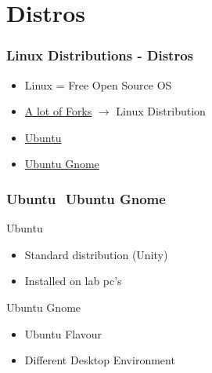 \begin{frame}
	
\end{frame}

\section{Distros}
\begin{frame}
	\frametitle{Linux Distributions - Distros}

	\begin{itemize}
		\item Linux = Free Open Source OS
        \item \href{https://upload.wikimedia.org/wikipedia/commons/1/1b/Linux_Distribution_Timeline.svg}{A lot of Forks} $\rightarrow$ Linux Distribution
	\end{itemize}
    \begin{itemize}
        \item \hyperlink{ubuntu}{Ubuntu}
        \item \hyperlink{ubuntu_gnome}{Ubuntu Gnome}
	\end{itemize}
\end{frame}

\begin{frame}[label=ubuntu]
	\frametitle{Ubuntu $ $ Ubuntu Gnome}
    Ubuntu
	\begin{itemize}
		\item Standard distribution (Unity)
		\item Installed on lab pc's
	\end{itemize}
    \vspace{0.5cm}
    Ubuntu Gnome
    \begin{itemize}
		\item Ubuntu Flavour
		\item Different Desktop Environment
	\end{itemize}
\end{frame}

